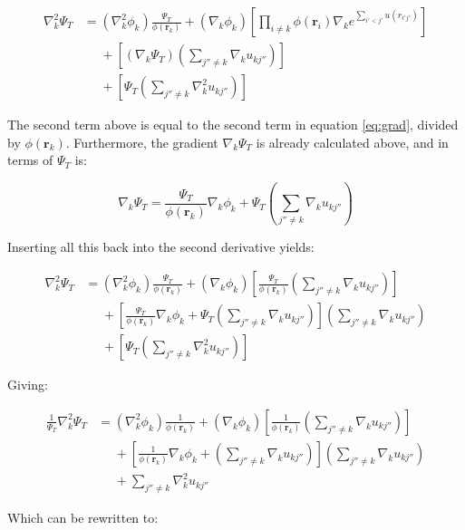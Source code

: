 \documentclass[english, a4paper]{article}
\newcommand{\bm}[1]{\mathbf{#1}}
\begin{document}
\begin{align*}
	\nabla_k^2\Psi_T &= (\nabla_k^2\phi_k)\frac{\Psi_T}{\phi(\bm{r}_k)} + (\nabla_k\phi_k) \left[\prod_{i\neq k}\phi(\bm{r}_i)\nabla_ke^{\sum_{i'<j'}u(r_{i'j'})}\right]\\
	&\:\:\:\:\:\: + \left[\left(\nabla_k\Psi_T\right)\left(\sum_{j''\neq k}\nabla_ku_{kj''} \right)\right]\\
	&\:\:\:\:\:\: + \left[\Psi_T\left(\sum_{j''\neq k}\nabla_k^2u_{kj''} \right)\right]
\end{align*}

The second term above is equal to the second term in equation \ref{eq:grad}, divided by $\phi(\bm{r}_k)$. Furthermore, the gradient $\nabla_k\Psi_T$ is already calculated above, and in terms of $\Psi_T$ is:

\begin{equation}
	\nabla_k\Psi_T = \frac{\Psi_T}{\phi(\bm{r}_k)}\nabla_k\phi_k + \Psi_T\left(\sum_{j''\neq k}\nabla_ku_{kj''} \right)
\end{equation}

Inserting all this back into the second derivative yields:

\begin{align*}
	\nabla_k^2\Psi_T &= (\nabla_k^2\phi_k)\frac{\Psi_T}{\phi(\bm{r}_k)} + (\nabla_k\phi_k) \left[\frac{\Psi_T}{\phi(\bm{r}_k)}\left(\sum_{j''\neq k}\nabla_ku_{kj''} \right)\right]\\
	&\:\:\:\:\:\: + \left[\frac{\Psi_T}{\phi(\bm{r}_k)}\nabla_k\phi_k + \Psi_T\left(\sum_{j''\neq k}\nabla_ku_{kj''} \right)\right]\left(\sum_{j''\neq k}\nabla_ku_{kj''} \right)\\
	&\:\:\:\:\:\: + \left[\Psi_T\left(\sum_{j''\neq k}\nabla_k^2u_{kj''} \right)\right]
\end{align*}

Giving:

\begin{align*}
	\frac{1}{\Psi_T}\nabla_k^2\Psi_T &= (\nabla_k^2\phi_k)\frac{1}{\phi(\bm{r}_k)} + (\nabla_k\phi_k) \left[\frac{1}{\phi(\bm{r}_k)}\left(\sum_{j''\neq k}\nabla_ku_{kj''} \right)\right]\\
	&\:\:\:\:\:\: + \left[\frac{1}{\phi(\bm{r}_k)}\nabla_k\phi_k + \left(\sum_{j''\neq k}\nabla_ku_{kj''} \right)\right]\left(\sum_{j''\neq k}\nabla_ku_{kj''} \right)\\
	&\:\:\:\:\:\: + \sum_{j''\neq k}\nabla_k^2u_{kj''}
\end{align*}

Which can be rewritten to:
\end{document}

